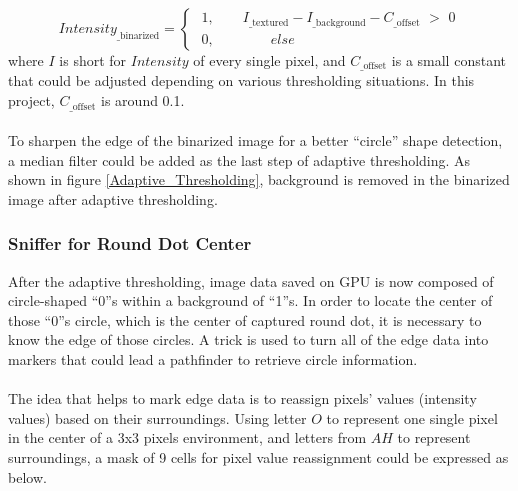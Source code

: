 \begin{equation}
%
Intensity_{\text{\_binarized}} = %
%
\begin{cases}
\,\, 1 , \quad \quad I_{\text{\_textured}} - I_{\text{\_background}}  -  C_{\text{\_offset}} \,\, > \,\,0 %
\\%
\,\, 0 , \quad \quad \quad \quad else%
\end{cases}
%
\end{equation}%
%
where \(I\) is short for \(Intensity\) of every single pixel, and \(C_{\text{\_offset}}\) is a small constant that could be adjusted depending on various thresholding situations. In this project, \(C_{\text{\_offset}}\) is around 0.1.%
\\\\%
To sharpen the edge of the binarized image for a better \enquote{circle} shape detection, a median filter could be added as the last step of adaptive thresholding. As shown in figure \ref{Adaptive_Thresholding}, background is removed in the binarized image after adaptive thresholding.
%
%
\subsubsection{Sniffer for Round Dot Center}
After the adaptive thresholding, image data saved on GPU is now composed of circle-shaped \enquote{0}s within a background of \enquote{1}s. In order to locate the center of those \enquote{0}s circle, which is the center of captured round dot, it is necessary to know the edge of those circles. A trick is used to turn all of the edge data into markers that could lead a pathfinder to retrieve circle information.%
\\\\%
The idea that helps to mark edge data is to reassign pixels' values (intensity values) based on their surroundings. Using letter \(O\) to represent one single pixel in the center of a 3x3 pixels environment, and letters from \(A\)\texttildelow \(H\) to represent surroundings, a mask of 9 cells for pixel value reassignment could be expressed as below.

